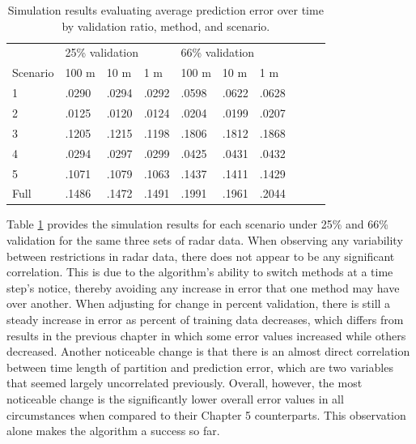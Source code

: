 \documentclass[12pt]{uthesis-v12}  %
\begin{document}
\begin{table}[!t]
\caption{Simulation results evaluating average prediction error over time by validation ratio, method, and scenario.}
\renewcommand{\arraystretch}{1.3}
\centering
{\begin{tabular}{*{10}{l}}
\toprule
& \multicolumn{3}{l}{25\% validation} & \multicolumn{3}{l}{66\% validation} \\
Scenario & 100 m & 10 m & 1 m & 100 m & 10 m & 1 m \\ \midrule
1 & .0290 & .0294 & .0292 & .0598 & .0622 & .0628 \\
2 & .0125 & .0120 & .0124 & .0204 & .0199 & .0207 \\
3 & .1205 & .1215 & .1198 & .1806 & .1812 & .1868 \\
4 & .0294 & .0297 & .0299 & .0425 & .0431 & .0432 \\
5 & .1071 & .1079 & .1063 & .1437 & .1411 & .1429 \\
Full & .1486 & .1472 & .1491 & .1991 & .1961 & .2044 \\ \bottomrule
\end{tabular}}

\label{val-single2}
\end{table}

Table \ref{val-single2} provides the simulation results for each scenario under 25\% and 66\% validation for the same three sets of radar data. When observing any variability between restrictions in radar data, there does not appear to be any significant correlation. This is due to the algorithm's ability to switch methods at a time step's notice, thereby avoiding any increase in error that one method may have over another. When adjusting for change in percent validation, there is still a steady increase in error as percent of training data decreases, which differs from results in the previous chapter in which some error values increased while others decreased. Another noticeable change is that there is an almost direct correlation between time length of partition and prediction error, which are two variables that seemed largely uncorrelated previously. Overall, however, the most noticeable change is the significantly lower overall error values in all circumstances when compared to their Chapter 5 counterparts. This observation alone makes the algorithm a success so far.
\end{document}
